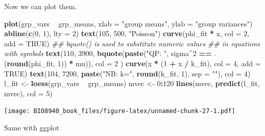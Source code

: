 \documentclass[
  12pt,
]{book}
\newenvironment{Shaded}{\begin{snugshade}}{\end{snugshade}}
\newcommand{\CommentTok}[1]{\textcolor[rgb]{0.56,0.35,0.01}{\textit{#1}}}
\newcommand{\DataTypeTok}[1]{\textcolor[rgb]{0.13,0.29,0.53}{#1}}
\newcommand{\DecValTok}[1]{\textcolor[rgb]{0.00,0.00,0.81}{#1}}
\newcommand{\KeywordTok}[1]{\textcolor[rgb]{0.13,0.29,0.53}{\textbf{#1}}}
\newcommand{\NormalTok}[1]{#1}
\newcommand{\OperatorTok}[1]{\textcolor[rgb]{0.81,0.36,0.00}{\textbf{#1}}}
\newcommand{\OtherTok}[1]{\textcolor[rgb]{0.56,0.35,0.01}{#1}}
\newcommand{\StringTok}[1]{\textcolor[rgb]{0.31,0.60,0.02}{#1}}
\begin{document}
Now we can plot them.

\begin{Shaded}
\begin{Highlighting}[]
\KeywordTok{plot}\NormalTok{(grp_vars }\OperatorTok{~}\StringTok{ }\NormalTok{grp_means, }\DataTypeTok{xlab =} \StringTok{"group means"}\NormalTok{, }\DataTypeTok{ylab =} \StringTok{"group variances"}\NormalTok{)}
\KeywordTok{abline}\NormalTok{(}\KeywordTok{c}\NormalTok{(}\DecValTok{0}\NormalTok{, }\DecValTok{1}\NormalTok{), }\DataTypeTok{lty =} \DecValTok{2}\NormalTok{)}
\KeywordTok{text}\NormalTok{(}\DecValTok{105}\NormalTok{, }\DecValTok{500}\NormalTok{, }\StringTok{"Poisson"}\NormalTok{)}
\KeywordTok{curve}\NormalTok{(phi_fit }\OperatorTok{*}\StringTok{ }\NormalTok{x, }\DataTypeTok{col =} \DecValTok{2}\NormalTok{, }\DataTypeTok{add =} \OtherTok{TRUE}\NormalTok{)}
\CommentTok{## bquote() is used to substitute numeric values}
\CommentTok{## in equations with symbols}
\KeywordTok{text}\NormalTok{(}\DecValTok{110}\NormalTok{, }\DecValTok{3900}\NormalTok{,}
  \KeywordTok{bquote}\NormalTok{(}\KeywordTok{paste}\NormalTok{(}\StringTok{"QP: "}\NormalTok{, sigma}\OperatorTok{^}\DecValTok{2} \OperatorTok{==}\StringTok{ }\NormalTok{.(}\KeywordTok{round}\NormalTok{(phi_fit, }\DecValTok{1}\NormalTok{)) }\OperatorTok{*}\StringTok{ }\NormalTok{mu)),}
  \DataTypeTok{col =} \DecValTok{2}
\NormalTok{)}
\KeywordTok{curve}\NormalTok{(x }\OperatorTok{*}\StringTok{ }\NormalTok{(}\DecValTok{1} \OperatorTok{+}\StringTok{ }\NormalTok{x }\OperatorTok{/}\StringTok{ }\NormalTok{k_fit), }\DataTypeTok{col =} \DecValTok{4}\NormalTok{, }\DataTypeTok{add =} \OtherTok{TRUE}\NormalTok{)}
\KeywordTok{text}\NormalTok{(}\DecValTok{104}\NormalTok{, }\DecValTok{7200}\NormalTok{, }\KeywordTok{paste}\NormalTok{(}\StringTok{"NB: k="}\NormalTok{, }\KeywordTok{round}\NormalTok{(k_fit, }\DecValTok{1}\NormalTok{), }\DataTypeTok{sep =} \StringTok{""}\NormalTok{), }\DataTypeTok{col =} \DecValTok{4}\NormalTok{)}
\NormalTok{l_fit <-}\StringTok{ }\KeywordTok{loess}\NormalTok{(grp_vars }\OperatorTok{~}\StringTok{ }\NormalTok{grp_means)}
\NormalTok{mvec <-}\StringTok{ }\DecValTok{0}\OperatorTok{:}\DecValTok{120}
\KeywordTok{lines}\NormalTok{(mvec, }\KeywordTok{predict}\NormalTok{(l_fit, mvec), }\DataTypeTok{col =} \DecValTok{5}\NormalTok{)}
\end{Highlighting}
\end{Shaded}

\texttt{[image: BIO8940\_book\_files/figure-latex/unnamed-chunk-27-1.pdf]}

Same with ggplot
\end{document}
